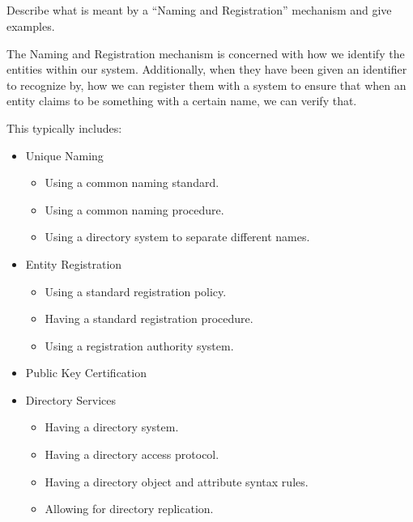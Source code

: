 \begin{questions}
\begin{parts}
  \part{} Describe what is meant by a ``Naming and Registration'' mechanism and give examples.
    \begin{solution}
      The Naming and Registration mechanism is concerned with how we identify the entities within our system.
      Additionally, when they have been given an identifier to recognize by, how we can register them with a system to ensure that when an entity claims to be something with a certain name, we can verify that.

      This typically includes:
      \begin{itemize}[noitemsep]
      \item Unique Naming
        \begin{itemize}[noitemsep]
        \item Using a common naming standard.
        \item Using a common naming procedure.
        \item Using a directory system to separate different names.
        \end{itemize}
      \item Entity Registration
        \begin{itemize}[noitemsep]
        \item Using a standard registration policy.
        \item Having a standard registration procedure.
        \item Using a registration authority system.
        \end{itemize}
      \item Public Key Certification
      \item Directory Services
        \begin{itemize}[noitemsep]
        \item Having a directory system.
        \item Having a directory access protocol.
        \item Having a directory object and attribute syntax rules.
        \item Allowing for directory replication.
        \end{itemize}
      \end{itemize}
    \end{solution}

  \end{parts}


\end{questions}
